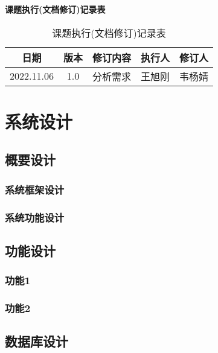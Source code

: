 \documentclass[twoside,11pt]{article}
\begin{document}
\begin{center}
    \Large \textbf{课题执行(文档修订)记录表}
\end{center}

\begin{table}[H]
    \centering
    \caption{课题执行(文档修订)记录表}
    \begin{tabular}{|c|c|c|c|c|}
        \hline
        日期       & 版本 & 修订内容 & 执行人 & 修订人 \\
        \hline
        2022.11.06 & 1.0  & 分析需求 & 王旭刚 & 韦杨婧 \\
        \hline
    \end{tabular}

    \label{tab:tab1}
\end{table}

\newpage



\begin{center}
    \tableofcontents
\end{center}
\thispagestyle{empty}
\newpage





\section{系统设计}
\subsection{概要设计}
\subsubsection{系统框架设计}
\subsubsection{系统功能设计}
\subsection{功能设计}
\subsubsection{功能1}
\subsubsection{功能2}
\subsection{数据库设计}
\end{document}
